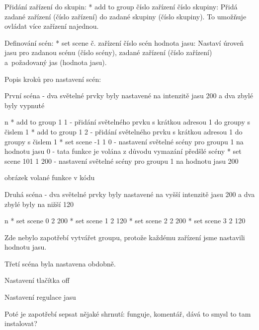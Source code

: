 \medskip\noindent
{\sbf Přidání zařízení do skupin:}
\begitems
    * {\sbf add to group číslo zařízení číslo skupiny:}
        Přidá zadané zařízení (číslo zařízení) do zadané skupiny (číslo skupiny).
        To umožňuje ovládat více zařízení najednou.
\enditems

\medskip\noindent
{\sbf Definování scén:}
\begitems
    * {\sbf set scene č. zařízení číslo scén hodnota jasu:}
        Nastaví úroveň jasu pro zadanou scénu (číslo scény), zadané zařízení
        (číslo zařízení) a~požadovaný jas (hodnota jasu).
\enditems

Popis kroků pro nastavení scén:

První scéna - dva světelné prvky byly nastavené na intenzitě jasu 200 a dva zbylé byly vypnuté 

\begitems \style n
* add to group 1 1 - přidání světelného prvku s krátkou adresou 1 do groupy s čislem 1
* add to group 1 2 - přidání světelného prvku s krátkou adresou 1 do groupy s čislem 1
* set scene -1 1 0 - nastavení světelné scény pro groupu 1 na hodnotu jasu 0 - tata funkce je volána z důvodu vymazání předšlé scény
* set scene 101 1 200 - nastavení světelné scény pro groupu 1 na hodnotu jasu 200
\enditems

obrázek volané funkce v kódu

Druhá scéna - dva světelné prvky byly nastavené na vyšší intenzitě jasu 200 a dva zbylé byly na nižší 120

\begitems \style n
* set scene 0 2 200  
* set scene 1 2 120 
* set scene 2 2 200 
* set scene 3 2 120 
\enditems

Zde nebylo zapotřebí vytvářet groupu, protože každému zařízení jsme nastavili hodnotu jasu.

Třetí scéna byla nastavena obdobně. 

Nastavení tlačítka off

Nastavení regulace jasu

Poté je zapotřebí sepsat nějaké shrnutí: funguje, komentář, dává to smysl to tam instalovat?











